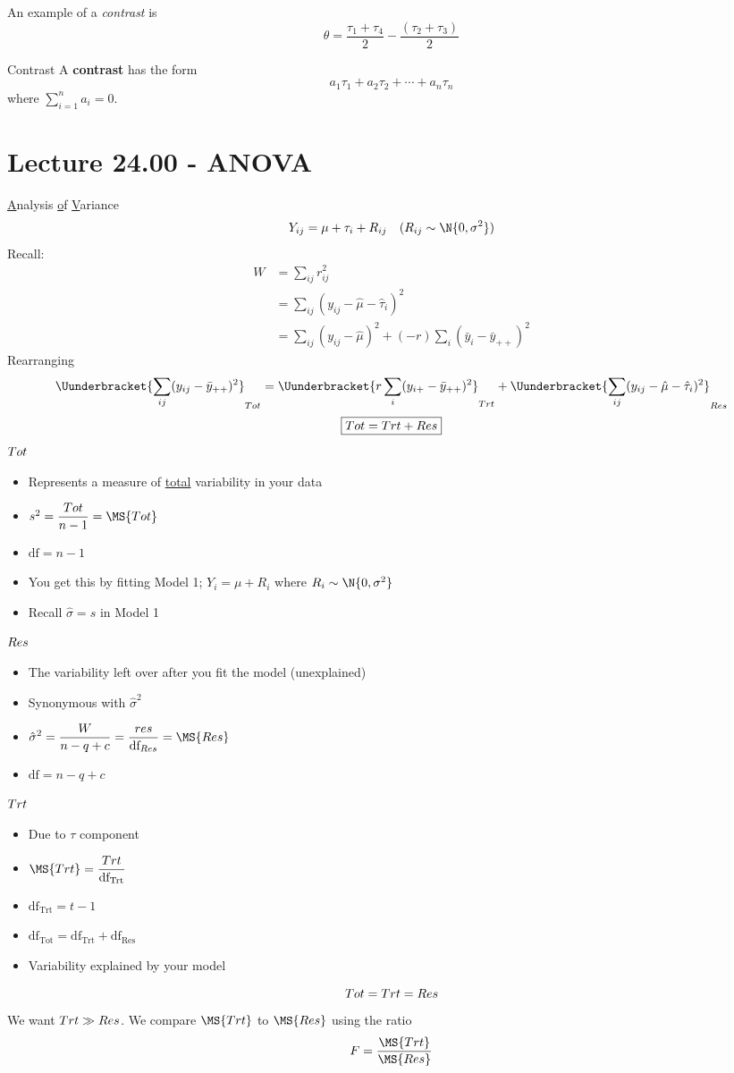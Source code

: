 An example of a \emph{contrast} is
\[ \theta=\frac{\tau_1+\tau_4}{2} -\frac{(\tau_2+\tau_3)}{2}  \]
\begin{Definition}{Contrast}{}
    A \textbf{contrast} has the form
    \[ a_1\tau_1+a_2\tau_2+\cdots+a_n\tau_n \]
    where $ \sum_{i=1}^{n} a_i=0 $.
\end{Definition}

\section{Lecture 24.00 - ANOVA}
\underline{A}nalysis \underline{o}f \underline{V}ariance
\[ Y_{ij}=\mu+\tau_i+R_{ij}\quad(R_{ij}\sim \N{0,\sigma^2}) \]
Recall:
\begin{align*}
    W
     & =\sum_{ij}r_{ij}^2                                                      \\
     & =\sum_{ij}(y_{ij}-\hat{\mu}-\hat{\tau}_i)^2                             \\
     & =\sum_{ij}(y_{ij}-\hat{\mu})^2+(-r)\sum_{i}(\bar{y}_{i}-\bar{y}_{++})^2
\end{align*}
Rearranging
\[ \Uunderbracket{\sum_{ij}(y_{ij}-\bar{y}_{++})^2}_{\SS{Tot}}
    =\Uunderbracket{r \sum_{i}(y_{i+}-\bar{y}_{++})^2}_{\SS{Trt}}+
    \Uunderbracket{\sum_{ij}(y_{ij}-\hat{\mu}-\hat{\tau}_i)^2}_{\SS{Res}}   \]
\[ \boxed{\relax{Tot}=\relax{Trt}+\relax{Res}} \]
$ \relax{Tot} $
\begin{itemize}
    \item Represents a measure of \underline{total}
          variability in your data
    \item $ s^2=\dfrac{\SS{Tot}}{n-1}=\MS{Tot} $
    \item $ \text{df}=n-1 $
    \item You get this by fitting Model 1; $ Y_{i}=\mu+R_{i} $
          where $ R_i \sim \N{0,\sigma^2} $
    \item Recall $ \hat{\sigma}=s $ in Model 1
\end{itemize}
$ \relax{Res} $
\begin{itemize}
    \item The variability left over after you fit the model (unexplained)
    \item Synonymous with $ \hat{\sigma}^2 $
    \item $ \displaystyle \hat{\sigma}^2=\frac{W}{n-q+c} =\frac{\SS{res}}{\text{df}_{Res}}=\MS{Res} $
    \item $ \text{df}=n-q+c $
\end{itemize}
$ \relax{Trt} $
\begin{itemize}
    \item Due to $ \tau $ component
    \item $ \MS{Trt}=\dfrac{\SS{Trt}}{\text{df}_{\text{Trt}}} $
    \item $ \text{df}_{\text{Trt}}=t-1 $
    \item $ \boxed{\text{df}_{\text{Tot}}=\text{df}_{\text{Trt}}+\text{df}_{\text{Res}}} $
    \item Variability explained by your model
\end{itemize}
\[ \relax{Tot}=\relax{Trt}=\relax{Res} \]
We want $ \relax{Trt}\gg \relax{Res} $. We compare
$ \MS{Trt} $ to $ \MS{Res} $ using the ratio
\[ F=\frac{\MS{Trt}}{\MS{Res}} \]

